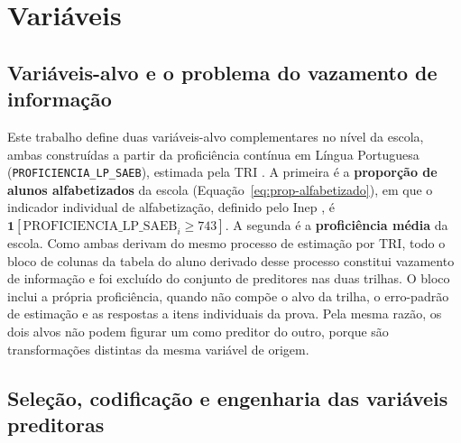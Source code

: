 \section{Variáveis}
\label{sec:variaveis}

\subsection{Variáveis-alvo e o problema do vazamento de informação}

Este trabalho define duas variáveis-alvo complementares no nível da escola,
ambas construídas a partir da proficiência contínua em Língua Portuguesa
(\texttt{PROFICIENCIA\_LP\_SAEB}), estimada pela TRI \cite{klein2003tri}. A
primeira é a \textbf{proporção de alunos alfabetizados} da escola
(Equação~\ref{eq:prop-alfabetizado}), em que o indicador individual de
alfabetização, definido pelo Inep \cite{inep2023alfabetiza}, é
$\mathbf{1}[\text{PROFICIENCIA\_LP\_SAEB}_i \geq 743]$. A segunda é a
\textbf{proficiência média} da escola. Como ambas derivam do mesmo processo
de estimação por TRI, todo o bloco de colunas da tabela do aluno derivado
desse processo constitui vazamento de informação e foi excluído do
conjunto de preditores nas duas trilhas. O bloco inclui a própria
proficiência, quando não compõe o alvo da trilha, o erro-padrão de
estimação e as respostas a itens individuais da prova. Pela mesma razão,
os dois alvos não podem figurar um como preditor do outro, porque são
transformações distintas da mesma variável de origem.

\subsection{Seleção, codificação e engenharia das variáveis preditoras}

